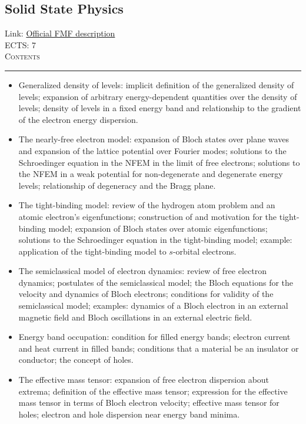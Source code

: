 \documentclass[11pt, a4paper]{article}
\newenvironment{course}[3]{
\subsection{#1}%
Link: \href{#2}{Official FMF description}\\%
ECTS: #3%
\vspace{1ex}
\\
{\large \textsc{Contents}}\\[-0.9ex]%
\rule{\textwidth}{0.5pt}
\vspace{-3ex}
}
{}
\newenvironment{chapter}[1]{
\begin{tcolorbox}[title=#1, breakable]
}
{\end{tcolorbox}}
\begin{document}
\begin{course}{Solid State Physics}{https://www.fmf.uni-lj.si/en/study-physics/programmes/1fiz/2020/7000777/courses/1138/}{7}
\begin{chapter}{Electron states in a periodic potential}
\begin{itemize}
            \item Generalized density of levels: implicit definition of the generalized density of levels; expansion of arbitrary energy-dependent quantities over the density of levels; density of levels in a fixed energy band and relationship to the gradient of the electron energy dispersion.

            \item The nearly-free electron model: expansion of Bloch states over plane waves and expansion of the lattice potential over Fourier modes; solutions to the Schroedinger equation in the NFEM in the limit of free electrons; solutions to the NFEM in a weak potential for non-degenerate and degenerate energy levels; relationship of degeneracy and the Bragg plane.

            \item The tight-binding model: review of the hydrogen atom problem and an atomic electron's eigenfunctions; construction of and motivation for the tight-binding model; expansion of Bloch states over atomic eigenfunctions; solutions to the Schroedinger equation in the tight-binding model; example: application of the tight-binding model to $ s $-orbital electrons.

            \item The semiclassical model of electron dynamics: review of free electron dynamics; postulates of the semiclassical model; the Bloch equations for the velocity and dynamics of Bloch electrons; conditions for validity of the semiclassical model; examples: dynamics of a Bloch electron in an external magnetic field and Bloch oscillations in an external electric field.

            \item Energy band occupation: condition for filled energy bands; electron current and heat current in filled bands; conditions that a material be an insulator or conductor; the concept of holes.

            \item The effective mass tensor: expansion of free electron dispersion about extrema; definition of the effective mass tensor; expression for the effective mass tensor in terms of Bloch electron velocity; effective mass tensor for holes; electron and hole dispersion near energy band minima.
        
        \end{itemize}
    \end{chapter}

    \begin{chapter}{Semiconductor physics}
        \begin{itemize}
        

\end{itemize}
\end{chapter}
\end{course}
\end{document}
